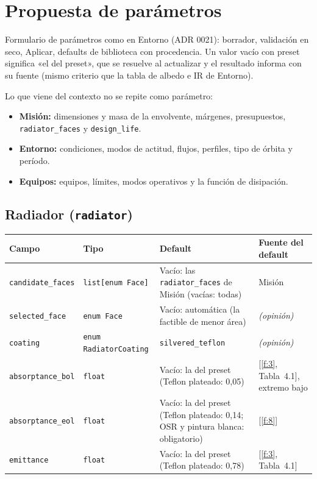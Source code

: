 \documentclass[11pt,a4paper]{article}
\newcommand{\code}[1]{\texttt{#1}}
\newcommand{\op}[1]{\textcolor{opinion}{\textit{(#1)}}}
\newcommand{\f}[1]{\ref{f:#1}}
\begin{document}
\section{Propuesta de parámetros}\label{sec:parametros}

Formulario de parámetros como en Entorno (ADR 0021): borrador, validación en seco, Aplicar, defaults de biblioteca con procedencia. Un valor vacío con preset significa «el del preset», que se resuelve al actualizar y el resultado informa con su fuente (mismo criterio que la tabla de albedo e IR de Entorno).

Lo que viene del contexto no se repite como parámetro:
\begin{itemize}
  \item \textbf{Misión:} dimensiones y masa de la envolvente, márgenes, presupuestos, \code{radiator\_faces} y \code{design\_life}.
  \item \textbf{Entorno:} condiciones, modos de actitud, flujos, perfiles, tipo de órbita y período.
  \item \textbf{Equipos:} equipos, límites, modos operativos y la función de disipación.
\end{itemize}

\subsection{Radiador (\code{radiator})}

{\small
\begin{xltabular}{\textwidth}{@{}P{3.4cm}P{2.6cm}LP{2.8cm}@{}}
\toprule
\textbf{Campo} & \textbf{Tipo} & \textbf{Default} & \textbf{Fuente del default} \\
\midrule
\endhead
\code{candidate\_faces} & \code{list[enum Face]} & Vacío: las \code{radiator\_faces} de Misión (vacías: todas) & Misión \\
\code{selected\_face} & \code{enum Face} & Vacío: automática (la factible de menor área) & \op{opinión} \\
\code{coating} & \code{enum RadiatorCoating} & \code{silvered\_teflon} & \op{opinión} \\
\code{absorptance\_bol} & \code{float} & Vacío: la del preset (Teflon plateado: 0,05) & [\f{3}, Tabla~4.1], extremo bajo \\
\code{absorptance\_eol} & \code{float} & Vacío: la del preset (Teflon plateado: 0,14; OSR y pintura blanca: obligatorio) & [\f{8}] \\
\code{emittance} & \code{float} & Vacío: la del preset (Teflon plateado: 0,78) & [\f{3}, Tabla~4.1] \\
\bottomrule
\end{xltabular}
}
\end{document}
